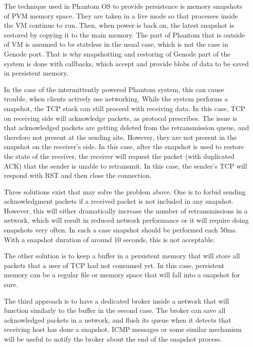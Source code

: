 The technique used in Phantom OS to provide persistence is memory snapshots of 
PVM memory space. They are taken in a live mode so that processes inside the VM
continue to run. Then, when power is back on, the latest snapshot is restored by
copying it to the main memory. The part of Phantom that is outside of VM is
assumed to be stateless in the usual case, which is not the case in Genode port.
That is why snapshotting and restoring of Genode part of the system is done with
callbacks, which accept and provide blobs of data to be saved in persistent 
memory. 

In the case of the intermittently powered Phantom system, this can cause
trouble, when clients actively use networking. While the system performs a
snapshot, the TCP stack can still proceed with receiving data. In this case,
TCP on receiving side will acknowledge packets, as protocol prescribes.
The issue is that acknowledged packets are getting deleted from the
retransmission queue, and therefore not present at the sending site. However,
they are not present in the snapshot on the receiver's side. In this case, after
the snapshot is used to restore the state of the receiver, the receiver will
request the packet (with duplicated ACK) that the sender is unable to 
retransmit. In this case, the sender's TCP will respond with RST and then close
the connection.

Three solutions exist that may solve the problem above. One is to forbid
sending acknowledgment packets if a received packet is not included in any
snapshot. However, this will either dramatically increase the number of
retransmissions in a network, which will result in reduced network performance
or it will require doing snapshots very often. In such a case snapshot should
be performed each 50ms. With a snapshot duration of around 10 seconds, this is
not acceptable.  

The other solution is to keep a buffer in a persistent memory that will store
all packets that a user of TCP had not consumed yet. In this case, persistent
memory can be a regular file or memory space that will fall into a snapshot for
sure.

The third approach is to have a dedicated broker inside a network that will
function similarly to the buffer in the second case. The broker can save all
acknowledged packets in a network, and flush its queue when it detects that
receiving host has done a snapshot. ICMP messages or some similar mechanism
will be useful to notify the broker about the end of the snapshot process.

